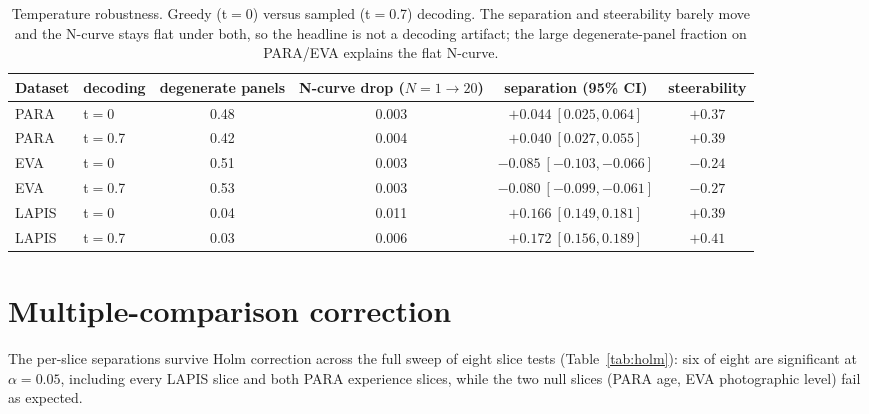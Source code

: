 \documentclass[10pt,twocolumn,letterpaper]{article}
\begin{document}
\begin{table}[t]
  \caption{Temperature robustness. Greedy (t$=$0) versus sampled (t$=$0.7) decoding. The separation and steerability barely move and the N-curve stays flat under both, so the headline is not a decoding artifact; the large degenerate-panel fraction on PARA/EVA explains the flat N-curve.}
  \label{tab:temp}
  \centering
  \small
  \setlength{\tabcolsep}{3.5pt}
  \begin{tabular}{llcccc}
    \toprule
    Dataset & decoding & degenerate panels & N-curve drop ($N{=}1{\to}20$) & separation (95\% CI) & steerability \\
    \midrule
    PARA  & t$=$0    & 0.48 & 0.003 & $+0.044\ [0.025, 0.064]$ & $+0.37$ \\
    PARA  & t$=$0.7  & 0.42 & 0.004 & $+0.040\ [0.027, 0.055]$ & $+0.39$ \\
    EVA   & t$=$0    & 0.51 & 0.003 & $-0.085\ [-0.103, -0.066]$ & $-0.24$ \\
    EVA   & t$=$0.7  & 0.53 & 0.003 & $-0.080\ [-0.099, -0.061]$ & $-0.27$ \\
    LAPIS & t$=$0    & 0.04 & 0.011 & $+0.166\ [0.149, 0.181]$ & $+0.39$ \\
    LAPIS & t$=$0.7  & 0.03 & 0.006 & $+0.172\ [0.156, 0.189]$ & $+0.41$ \\
    \bottomrule
  \end{tabular}
\end{table}

\section{Multiple-comparison correction}
The per-slice separations survive Holm correction across the full sweep of eight slice tests (Table~\ref{tab:holm}): six of eight are significant at $\alpha=0.05$, including every LAPIS slice and both PARA experience slices, while the two null slices (PARA age, EVA photographic level) fail as expected.
\end{document}
